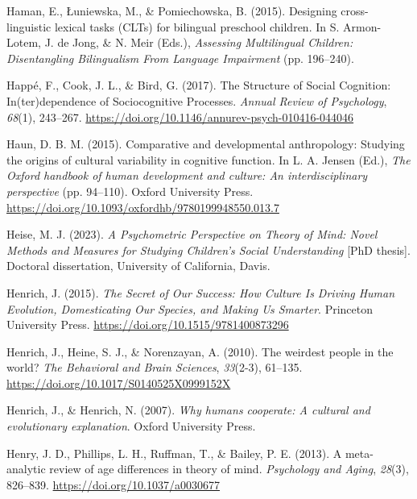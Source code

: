 \documentclass[
]{scrbook}
\newlength{\cslhangindent}
\newenvironment{CSLReferences}[2] %
 {\begin{list}{}{%
  \setlength{\itemindent}{0pt}
  \setlength{\leftmargin}{0pt}
  \setlength{\parsep}{0pt}
  \ifodd #1
   \setlength{\leftmargin}{\cslhangindent}
   \setlength{\itemindent}{-1\cslhangindent}
  \fi
  \setlength{\itemsep}{#2\baselineskip}}}
 {\end{list}}
\begin{document}
\begin{CSLReferences}{1}{0}
Haman, E., Łuniewska, M., \& Pomiechowska, B. (2015). Designing cross-linguistic lexical tasks ({CLTs}) for bilingual preschool children. In S. Armon-Lotem, J. de Jong, \& N. Meir (Eds.), \emph{Assessing {Multilingual Children}: {Disentangling Bilingualism From Language Impairment}} (pp. 196--240).

Happé, F., Cook, J. L., \& Bird, G. (2017). The {Structure} of {Social Cognition}: {In}(ter)dependence of {Sociocognitive Processes}. \emph{Annual Review of Psychology}, \emph{68}(1), 243--267. \url{https://doi.org/10.1146/annurev-psych-010416-044046}

Haun, D. B. M. (2015). Comparative and developmental anthropology: {Studying} the origins of cultural variability in cognitive function. In L. A. Jensen (Ed.), \emph{The {Oxford} handbook of human development and culture: {An} interdisciplinary perspective} (pp. 94--110). Oxford University Press. \url{https://doi.org/10.1093/oxfordhb/9780199948550.013.7}

Heise, M. J. (2023). \emph{A {Psychometric Perspective} on {Theory} of {Mind}: {Novel Methods} and {Measures} for {Studying Children}'s {Social Understanding}} {[}PhD thesis{]}. Doctoral dissertation, University of California, Davis.

Henrich, J. (2015). \emph{The {Secret} of {Our Success}: {How Culture Is Driving Human Evolution}, {Domesticating Our Species}, and {Making Us Smarter}}. Princeton University Press. \url{https://doi.org/10.1515/9781400873296}

Henrich, J., Heine, S. J., \& Norenzayan, A. (2010). The weirdest people in the world? \emph{The Behavioral and Brain Sciences}, \emph{33}(2-3), 61--135. \url{https://doi.org/10.1017/S0140525X0999152X}

Henrich, J., \& Henrich, N. (2007). \emph{Why humans cooperate: {A} cultural and evolutionary explanation}. Oxford University Press.

Henry, J. D., Phillips, L. H., Ruffman, T., \& Bailey, P. E. (2013). A meta-analytic review of age differences in theory of mind. \emph{Psychology and Aging}, \emph{28}(3), 826--839. \url{https://doi.org/10.1037/a0030677}


\end{CSLReferences}
\end{document}
